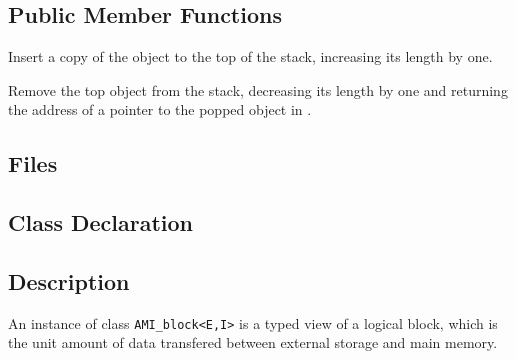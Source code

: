 \subsection{Public Member Functions}
   \btabb 

       {Insert a copy of the
      object  to the top of the stack, increasing its length by
      one.}

        {Remove the top object from
       the stack, decreasing its length by one and returning the address of
       a pointer to the popped object in .}

   \etabb



\subsection{Files}
  \btabb
         {}
  \etabb

\subsection{Class Declaration}
   \btabb

   \etabb

\subsection{Description}

An instance of class {\tt AMI\_block<E,I>} is a typed
view of a logical block, which is the unit amount of data transfered
between external storage and main memory. 

